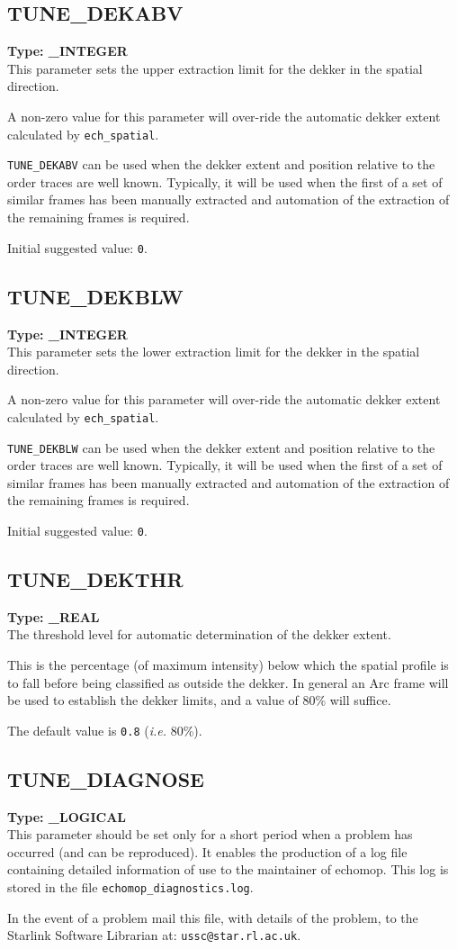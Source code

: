 \documentclass[11pt,twoside]{article}
\makeatletter
\newcommand{\htmlref}[2]{#1}
\newcommand{\xlabel}[1]{}
\newcommand{\indexcmdname}[1]{\index{#1@\protect\cmdname{#1}}}
\renewcommand{\indexcmdname}[1]{}
\newcommand{\cmdname}{\begingroup \catcode`\_=12 \realcmdname}
\newcommand{\realcmdname}[1]{\endgroup\texttt{#1}}
\newcommand{\echparameter}[4]
{
\item [#1 = #3] \mbox{}\label{par_#2}\indexcmdname{#2}
\\
#4
}
\renewcommand{\echparameter}[4]
{
  \subsection{\xlabel{par_#2}\label{par_#2}{\bf #1}}
  {\bf Type: #3}\\
#4
}
\makeatother
\begin{document}
\echparameter{TUNE\_DEKABV}{TUNE_DEKABV}{
 \_INTEGER
}{
 This parameter sets the upper extraction limit for the dekker
 in the spatial direction.

 A non-zero value for this parameter will over-ride the
 automatic dekker extent calculated by
 \htmlref{{\tt ech\_spatial}}{ech_spatial}.

 {\tt TUNE\_DEKABV} can be used when the dekker extent and position
 relative to the order traces are well known.  Typically, it will
 be used when the first of a set of similar frames has been manually
 extracted and automation of the extraction of the remaining
 frames is required.

 Initial suggested value: \texttt{0}.
}

\echparameter{TUNE\_DEKBLW}{TUNE_DEKBLW}{
 \_INTEGER
}{
 This parameter sets the lower extraction limit for the dekker
 in the spatial direction.

 A non-zero value for this parameter will over-ride the
 automatic dekker extent calculated by
 \htmlref{{\tt ech\_spatial}}{ech_spatial}.

 {\tt TUNE\_DEKBLW} can be used when the dekker extent and position
 relative to the order traces are well known.  Typically, it will
 be used when the first of a set of similar frames has been manually
 extracted and automation of the extraction of the remaining
 frames is required.

 Initial suggested value: \texttt{0}.
}

\echparameter{TUNE\_DEKTHR}{TUNE_DEKTHR}{
 \_REAL
}{
 The threshold level for automatic determination of the dekker extent.

 This is the percentage (of maximum intensity) below which the spatial
 profile is to fall before being classified as outside the dekker.
 In general an Arc frame will be used to establish the dekker limits,
 and a value of 80\% will suffice.

 The default value is \texttt{0.8} ({\it{i.e.}} 80\%).
}

\echparameter{TUNE\_DIAGNOSE}{TUNE_DIAGNOSE}{
 \_LOGICAL
}{
 This parameter should be set only for a short period when a
 problem has occurred (and can be reproduced).  It enables the
 production of a log file containing detailed information of use to
 the maintainer of {\sc echomop.} This log is stored in the file
 {\tt echomop\_diagnostics.log}.

 In the event of a problem mail this file, with details of the
 problem, to the Starlink Software Librarian at:
 \texttt{ussc@star.rl.ac.uk}.
}
\end{document}
